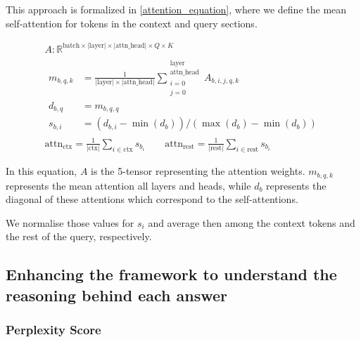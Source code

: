 This approach is formalized in \cref{attention_equation}, where we define the mean self-attention for tokens in the context and query sections.

\begin{equation}
	\newcommand{\lenmod}[1]{\left| \text{#1} \right|}
	\begin{gathered}
		A : \mathbb{R} ^ { \text{batch} \times \lenmod{layer}  \times \lenmod{attn\_head} \times Q \times K } \\[1ex]
		\begin{aligned}
			m_{b,q,k} &= \frac{1}{ \lenmod{layer} \times \lenmod{attn\_head} } \sum^{\substack{\text{layer} \\ \text{attn\_head}}}_{\substack{i = 0 \\ j = 0}} A_{b,i,j,q,k} \\
			d_{b, q} &= m_{b, q, q} \\
			s_{b, i} &= \left(d_{b, i} - \min{\left( d_b \right)}\right) / \left(\max{\left( d_b \right)} - \min{\left( d_b \right)} \right)
		\end{aligned} \\[1ex]
		\text{attn}_\text{ctx} = \frac{1}{\lenmod{ctx}} \sum_{i \in \text{ctx}} s_b_i \qquad
		\text{attn}_\text{rest} = \frac{1}{\lenmod{rest}} \sum_{i \in \text{rest}} s_b_i \qquad
	\end{gathered}
	\label{attention_equation}
\end{equation}

In this equation, $A$ is the 5-tensor representing the attention weights.
$m_{b,q,k}$ represents the mean attention all layers and heads, while $d_b$ represents the diagonal of these attentions which correspond to the self-attentions.

We normalise those values for $s_i$ and average then among the context tokens and the rest of the query, respectively.

\newpage{}

\subsection{Enhancing the framework to understand the reasoning behind each answer}
\label{method_perplexity}

\subsubsection{Perplexity Score}
\newcommand{\NLL}{\text{NLL}}
\newcommand{\PPL}{\text{PPL}}

